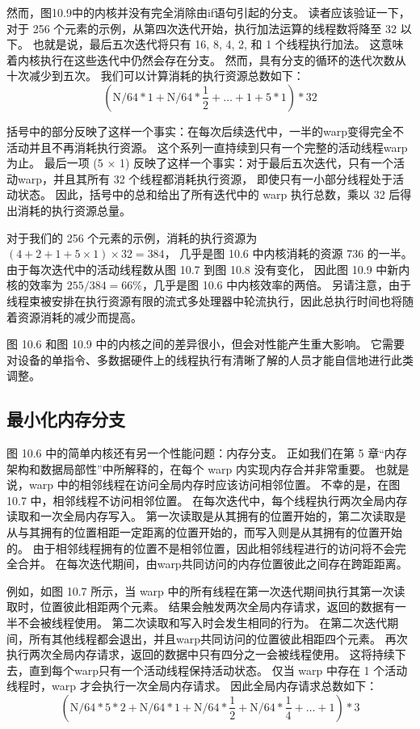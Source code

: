 然而，图10.9中的内核并没有完全消除由if语句引起的分支。 
读者应该验证一下，对于 256 个元素的示例，从第四次迭代开始，执行加法运算的线程数将降至 32 以下。
也就是说，最后五次迭代将只有 16, 8, 4, 2, 和 1 个线程执行加法。 这意味着内核执行在这些迭代中仍然会存在分支。 
然而，具有分支的循环的迭代次数从十次减少到五次。 我们可以计算消耗的执行资源总数如下：
$$
\left(\mathrm{N} / 64 * 1+\mathrm{N} / 64 * \frac{1}{2}+\ldots+1+5* 1\right)* 32
$$

括号中的部分反映了这样一个事实：在每次后续迭代中，一半的warp变得完全不活动并且不再消耗执行资源。 
这个系列一直持续到只有一个完整的活动线程warp为止。 
最后一项 (5 × 1) 反映了这样一个事实：对于最后五次迭代，只有一个活动warp，并且其所有 32 个线程都消耗执行资源，
即使只有一小部分线程处于活动状态。 因此，括号中的总和给出了所有迭代中的 warp 执行总数，乘以 32 后得出消耗的执行资源总量。

对于我们的 256 个元素的示例，消耗的执行资源为 $(4+2+1+5 × 1) × 32 = 384$，
几乎是图 10.6 中内核消耗的资源 736 的一半。 
由于每次迭代中的活动线程数从图 10.7 到图 10.8 没有变化，
因此图 10.9 中新内核的效率为 $255/384 = 66\%$，几乎是图 10.6 中内核效率的两倍。 
另请注意，由于线程束被安排在执行资源有限的流式多处理器中轮流执行，因此总执行时间也将随着资源消耗的减少而提高。

图 10.6 和图 10.9 中的内核之间的差异很小，但会对性能产生重大影响。 
它需要对设备的单指令、多数据硬件上的线程执行有清晰了解的人员才能自信地进行此类调整。

\subsection{最小化内存分支}
图 10.6 中的简单内核还有另一个性能问题：内存分支。 
正如我们在第 5 章“内存架构和数据局部性”中所解释的，在每个 warp 内实现内存合并非常重要。 
也就是说，warp 中的相邻线程在访问全局内存时应该访问相邻位置。 
不幸的是，在图 10.7 中，相邻线程不访问相邻位置。 在每次迭代中，每个线程执行两次全局内存读取和一次全局内存写入。 
第一次读取是从其拥有的位置开始的，第二次读取是从与其拥有的位置相距一定距离的位置开始的，而写入则是从其拥有的位置开始的。 
由于相邻线程拥有的位置不是相邻位置，因此相邻线程进行的访问将不会完全合并。 
在每次迭代期间，由warp共同访问的内存位置彼此之间存在跨距距离。

例如，如图 10.7 所示，当 warp 中的所有线程在第一次迭代期间执行其第一次读取时，位置彼此相距两个元素。 
结果会触发两次全局内存请求，返回的数据有一半不会被线程使用。 第二次读取和写入时会发生相同的行为。 
在第二次迭代期间，所有其他线程都会退出，并且warp共同访问的位置彼此相距四个元素。 
再次执行两次全局内存请求，返回的数据中只有四分之一会被线程使用。 
这将持续下去，直到每个warp只有一个活动线程保持活动状态。 
仅当 warp 中存在 1 个活动线程时，warp 才会执行一次全局内存请求。 因此全局内存请求总数如下：
$$
\left(\mathrm{N} / 64* 5* 2+\mathrm{N} / 64* 1+\mathrm{N} / 64*\frac{1}{2}+\mathrm{N} / 64*\frac{1}{4}+\ldots+1\right)* 3
$$

